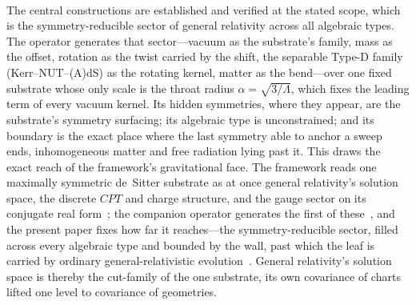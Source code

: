 \documentclass[11pt,a4paper]{article}
\theoremstyle{definition}
\begin{document}
\paragraph{}
The central constructions are established and verified at the stated scope, which is the symmetry-reducible sector of general relativity across all algebraic types. The operator generates that sector---vacuum as the substrate's family, mass as the offset, rotation as the twist carried by the shift, the separable Type-D family (Kerr--NUT--(A)dS) as the rotating kernel, matter as the bend---over one fixed substrate whose only scale is the throat radius $\alpha=\sqrt{3/\Lambda}$, which fixes the leading term of every vacuum kernel. Its hidden symmetries, where they appear, are the substrate's symmetry surfacing; its algebraic type is unconstrained; and its boundary is the exact place where the last symmetry able to anchor a sweep ends, inhomogeneous matter and free radiation lying past it. This draws the exact reach of the framework's gravitational face. The framework reads one maximally symmetric de~Sitter substrate as at once general relativity's solution space, the discrete $CPT$ and charge structure, and the gauge sector on its conjugate real form~\cite{JanzenCRframework}; the companion operator generates the first of these~\cite{JanzenOperator}, and the present paper fixes how far it reaches---the symmetry-reducible sector, filled across every algebraic type and bounded by the wall, past which the leaf is carried by ordinary general-relativistic evolution~\cite{JanzenDynamics}. General relativity's solution space is thereby the cut-family of the one substrate, its own covariance of charts lifted one level to covariance of geometries.
\end{document}
